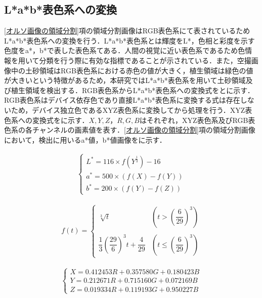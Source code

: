     \subsection{L*a*b*表色系への変換}
      \label{L*a*b*表色系への変換}
      \ref{オルソ画像の領域分割}項の領域分割画像はRGB表色系にて表されているためL*a*b*表色系への変換\cite{Lab表色系1}を行う．L*a*b*表色系とは輝度をL*，色相と彩度を示す色度をa*，b*で表した表色系てある．人間の視覚に近い表色系であるため色情報を用いて分類を行う際に有効な指標であることが示されている．また，空撮画像中の土砂領域はRGB表色系における赤色の値が大きく，植生領域は緑色の値が大きいという特徴があるため，本研究ではL*a*b*表色系を用いて土砂領域及び植生領域を検出する\cite{Lab表色系2, Lab表色系3, Lab表色系4}．RGB表色系からL*a*b*表色系への変換式をとに示す．RGB表色系はデバイス依存色であり直接L*a*b*表色系に変換する式は存在しないため，デバイス独立色であるXYZ表色系\cite{XYZ表色系}に変換してから処理を行う．XYZ表色系への変換式をに示す．$X,Y,Z$，$R,G,B$はそれぞれ，XYZ表色系及びRGB表色系の各チャンネルの画素値を表す．\ref{オルソ画像の領域分割}項の領域分割画像において，検出に用いるa*値，b*値画像をに示す．
      
      \begin{eqnarray}
      \label{Lab表色系1}
        \left\{
          \begin{array}{l}
            L^* = 116 \times f(Y^{\frac{1}{3}}) - 16 \\
            a^* = 500 \times (f(X) - f(Y)) \\
            b^* = 200 \times (f(Y) - f(Z))
          \end{array}
        \right.
      \end{eqnarray}

      \begin{eqnarray}
        \label{Lab表色系2}
          f(t) = 
          \left\{
            \begin{array}{lll}
              \sqrt[3]{t} 
                &(t >    (\dfrac{6} {29})^3) \\ \\
              \dfrac{1} {3} (\dfrac{29} {6})^3 t + \dfrac{4} {29}
                &(t \leq (\dfrac{6} {29})^3)
            \end{array}
          \right.
      \end{eqnarray}

      \begin{eqnarray}
        \label{XYZ表色系}
        \left\{
          \begin{array}{l}
            X = 0.412453R + 0.357580G + 0.180423B \\
            Y = 0.212671R + 0.715160G + 0.072169B \\
            Z = 0.019334R + 0.119193G + 0.950227B
          \end{array}
        \right.
      \end{eqnarray}

